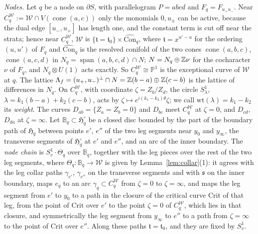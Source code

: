 \emph{Nodes.} Let $q$ be a node on $\partial S$, with parallelogram $P=abcd$ and $F_q=F_{u_+u_-}$. Near
$C^{\mathscr W}_q:=\mathscr W\cap V(\operatorname{cone}(a,c))$ only the monomials $0,u_\pm$ can be active, because the dual edge $[u_-,u_+]$ has
length one, and the constant term is cut off near the strata; hence near $C^{\mathscr W}_q$, $\mathscr W$ is
$\{\mathfrak t=\mathfrak t_0\}\times\widehat{\mathrm{Con}}_q$, where $\mathfrak t=x^{u'-u}$ for the ordering $(u,u')$ of $F_q$ and
$\widehat{\mathrm{Con}}_q$ is the resolved conifold of the two cones $\operatorname{cone}(a,b,c)$, $\operatorname{cone}(a,c,d)$ in
$N_q=\operatorname{span}(a,b,c,d)\cap N$; $N=N_q\oplus\mathbb Z\nu$ for the cocharacter $\nu$ of $F_q$, and $N_q\otimes U(1)$ acts
exactly. So $C^{\mathscr W}_q\cong\mathbb P^1$ is the exceptional curve of $\mathscr W$ at $q$. The lattice
$\Lambda_f=(u_+,u_-)^\perp\cap N=\mathbb Z(b-a)\oplus\mathbb Z(c-b)$ is the lattice of differences in $N_q$. On $C^{\mathscr W}_q$, with coordinate
$\zeta=Z_b/Z_d$, the circle $S^1_\lambda$, $\lambda=k_1(b-a)+k_2(c-b)$, acts by $\zeta\mapsto e^{i(k_1-k_2)\theta}\zeta$; we call
$\mathrm{wt}(\lambda)=k_1-k_2$ its \emph{weight}. The curves $D_{ab}=\{Z_a=Z_b=0\}$ and $D_{bc}$ meet $C^{\mathscr W}_q$ at $\zeta=0$, and
$D_{cd}$, $D_{da}$ at $\zeta=\infty$. Let $\mathbb B_q\subset\mathfrak H_q^\circ$ be a closed disc bounded by the part of the
boundary path of $\mathfrak H_q$ between points $e'$, $e''$ of the two leg segments near $y_0$ and $y_\infty$, the transverse
segments of $\mathfrak H_q^\circ$ at $e'$ and $e''$, and an arc of the inner boundary. The \emph{node chain} is $S^1_v\cdot\Theta_q$ over
$\mathbb B_q$, together with the leg pieces over the rest of the two leg segments, where $\Theta_q\colon\mathbb B_q\to \mathscr W$ is given
by Lemma~\ref{lem:collar}(1): it agrees with the leg collar paths $\gamma_{e'}$, $\gamma_{e''}$ on the transverse segments and
with $\mathfrak s$ on the inner boundary, maps $e_q$ to an arc $\gamma_q\subset C^{\mathscr W}_q$ from $\zeta=0$ to $\zeta=\infty$, and maps
the leg segment from $e'$ to $y_0$ to a path in the closure of the critical curve $\mathrm{Crit}$ of that leg, from the point
of $\mathrm{Crit}$ over $e'$ to the point $\zeta=0$ of $C^{\mathscr W}_q$, which lies in that closure, and symmetrically the leg segment
from $y_\infty$ to $e''$ to a path from $\zeta=\infty$ to the point of $\mathrm{Crit}$ over $e''$. Along these
paths $\mathfrak t=\mathfrak t_0$, and they are fixed by $S^1_v$.

